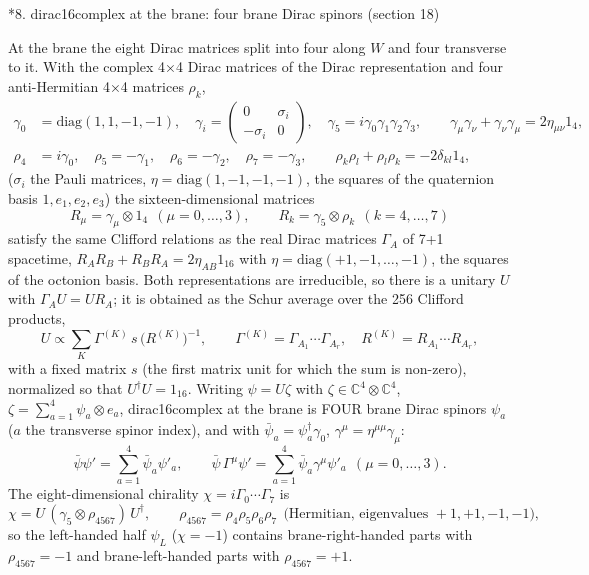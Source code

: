 \documentclass[10pt,a4paper]{article}
\makeatletter
\renewcommand\section{\@startsection{section}{1}{\z@}{-3.5ex \@plus -1ex \@minus -.2ex}{2.3ex \@plus.2ex}{\normalfont\Large\bfseries\raggedright}}
\makeatother
\begin{document}
\section*{8. dirac16complex at the brane: four brane Dirac spinors (section 18)}
At the brane the eight Dirac matrices split into four along $W$ and four transverse to it. With the complex 4×4 Dirac matrices of the Dirac representation and four anti-Hermitian 4×4 matrices $\rho_k$,
\begin{align*}
\gamma_0&=\mathrm{diag}(1,1,-1,-1),\quad \gamma_i=\begin{pmatrix}0&\sigma_i\\-\sigma_i&0\end{pmatrix},\quad \gamma_5=i\gamma_0\gamma_1\gamma_2\gamma_3,\qquad \gamma_\mu\gamma_\nu+\gamma_\nu\gamma_\mu=2\eta_{\mu\nu}1_4, \\
\rho_4&=i\gamma_0,\quad \rho_5=-\gamma_1,\quad \rho_6=-\gamma_2,\quad \rho_7=-\gamma_3,\qquad \rho_k\rho_l+\rho_l\rho_k=-2\delta_{kl}1_4,
\end{align*}
($\sigma_i$ the Pauli matrices, $\eta=\mathrm{diag}(1,-1,-1,-1)$, the squares of the quaternion basis $1,e_1,e_2,e_3$) the sixteen-dimensional matrices
\begin{equation*}
R_\mu=\gamma_\mu\otimes1_4\ \ (\mu=0,\dots,3),\qquad R_k=\gamma_5\otimes\rho_k\ \ (k=4,\dots,7)
\end{equation*}
satisfy the same Clifford relations as the real Dirac matrices $\Gamma_A$ of 7+1 spacetime, $R_AR_B+R_BR_A=2\eta_{AB}1_{16}$ with $\eta=\mathrm{diag}(+1,-1,\dots,-1)$, the squares of the octonion basis. Both representations are irreducible, so there is a unitary $U$ with $\Gamma_AU=UR_A$; it is obtained as the Schur average over the 256 Clifford products,
\begin{equation*}
U\propto\sum_{K}\Gamma^{(K)}\,s\,\big(R^{(K)}\big)^{-1},\qquad \Gamma^{(K)}=\Gamma_{A_1}\cdots\Gamma_{A_r},\quad R^{(K)}=R_{A_1}\cdots R_{A_r},
\end{equation*}
with a fixed matrix $s$ (the first matrix unit for which the sum is non-zero), normalized so that $U^\dagger U=1_{16}$. Writing $\psi=U\zeta$ with $\zeta\in\mathbb C^4\otimes\mathbb C^4$, $\zeta=\sum_{a=1}^4\psi_a\otimes e_a$, dirac16complex at the brane is FOUR brane Dirac spinors $\psi_a$ ($a$ the transverse spinor index), and with $\bar\psi_a=\psi_a^\dagger\gamma_0$, $\gamma^\mu=\eta^{\mu\mu}\gamma_\mu$:
\begin{equation*}
\bar\psi\psi'=\sum_{a=1}^4\bar\psi_a\psi'_a,\qquad \bar\psi\,\Gamma^\mu\psi'=\sum_{a=1}^4\bar\psi_a\gamma^\mu\psi'_a\ \ (\mu=0,\dots,3).
\end{equation*}
The eight-dimensional chirality $\chi=i\Gamma_0\cdots\Gamma_7$ is
\begin{equation*}
\chi=U\,(\gamma_5\otimes\rho_{4567})\,U^\dagger,\qquad \rho_{4567}=\rho_4\rho_5\rho_6\rho_7\ \ \text{(Hermitian, eigenvalues }+1,+1,-1,-1),
\end{equation*}
so the left-handed half $\psi_L$ ($\chi=-1$) contains brane-right-handed parts with $\rho_{4567}=-1$ and brane-left-handed parts with $\rho_{4567}=+1$.
\end{document}
